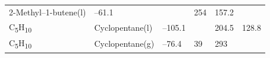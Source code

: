 \documentclass[
  9pt,
]{extbook}
\theoremstyle{definition}
\theoremstyle{definition}
\theoremstyle{definition}
\theoremstyle{remark}
\begin{document}
\begin{longtable}[]{@{}llllll@{}}
\begin{minipage}[t]{0.17\columnwidth}
2-Methyl--1-butene(l)\strut
\end{minipage} & \begin{minipage}[t]{0.15\columnwidth}\raggedright
--61.1\strut
\end{minipage} & \begin{minipage}[t]{0.15\columnwidth}\raggedright
\strut
\end{minipage} & \begin{minipage}[t]{0.14\columnwidth}\raggedright
254\strut
\end{minipage} & \begin{minipage}[t]{0.14\columnwidth}\raggedright
157.2\strut
\end{minipage}\tabularnewline
\begin{minipage}[t]{0.07\columnwidth}\raggedright
C\textsubscript{5}H\textsubscript{10}\strut
\end{minipage} & \begin{minipage}[t]{0.17\columnwidth}\raggedright
Cyclopentane(l)\strut
\end{minipage} & \begin{minipage}[t]{0.15\columnwidth}\raggedright
--105.1\strut
\end{minipage} & \begin{minipage}[t]{0.15\columnwidth}\raggedright
\strut
\end{minipage} & \begin{minipage}[t]{0.14\columnwidth}\raggedright
204.5\strut
\end{minipage} & \begin{minipage}[t]{0.14\columnwidth}\raggedright
128.8\strut
\end{minipage}\tabularnewline
\begin{minipage}[t]{0.07\columnwidth}\raggedright
C\textsubscript{5}H\textsubscript{10}\strut
\end{minipage} & \begin{minipage}[t]{0.17\columnwidth}\raggedright
Cyclopentane(g)\strut
\end{minipage} & \begin{minipage}[t]{0.15\columnwidth}\raggedright
--76.4\strut
\end{minipage} & \begin{minipage}[t]{0.15\columnwidth}\raggedright
39\strut
\end{minipage} & \begin{minipage}[t]{0.14\columnwidth}\raggedright
293\strut
\end{minipage} & \begin{minipage}[t]{0.14\columnwidth}\raggedright

\end{minipage}
\end{longtable}
\end{document}
